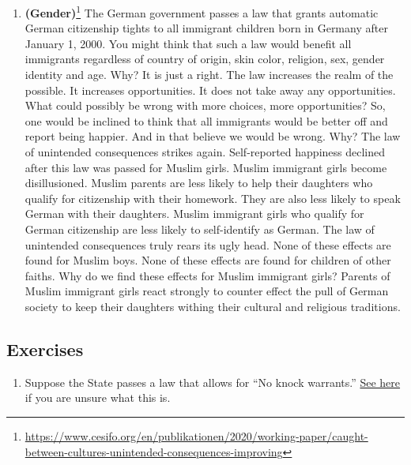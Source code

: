 \documentclass[
]{book}
\providecommand{\tightlist}{%
  \setlength{\itemsep}{0pt}\setlength{\parskip}{0pt}}
\begin{document}
\begin{enumerate}
\def\labelenumi{\arabic{enumi}.}
\setcounter{enumi}{6}
\tightlist
\item
  \textbf{(Gender)}\footnote{\url{https://www.cesifo.org/en/publikationen/2020/working-paper/caught-between-cultures-unintended-consequences-improving}} The German government passes a law that grants automatic German citizenship tights to all immigrant children born in Germany after January 1, 2000. You might think that such a law would benefit all immigrants regardless of country of origin, skin color, religion, sex, gender identity and age. Why? It is just a right. The law increases the realm of the possible. It increases opportunities. It does not take away any opportunities. What could possibly be wrong with more choices, more opportunities? So, one would be inclined to think that all immigrants would be better off and report being happier. And in that believe we would be wrong. Why? The law of unintended consequences strikes again.
  Self-reported happiness declined after this law was passed for Muslim girls. Muslim immigrant girls become disillusioned. Muslim parents are less likely to help their daughters who qualify for citizenship with their homework. They are also less likely to speak German with their daughters. Muslim immigrant girls who qualify for German citizenship are less likely to self-identify as German.
  The law of unintended consequences truly rears its ugly head.
  None of these effects are found for Muslim boys. None of these effects are found for children of other faiths.
  Why do we find these effects for Muslim immigrant girls? Parents of Muslim immigrant girls react strongly to counter effect the pull of German society to keep their daughters withing their cultural and religious traditions.
\end{enumerate}

\hypertarget{exercises}{%
\subsection{Exercises}\label{exercises}}

\begin{enumerate}
\def\labelenumi{\arabic{enumi}.}
\tightlist
\item
  Suppose the State passes a law that allows for ``No knock warrants.'' \href{https://en.wikipedia.org/wiki/No-knock_warrant\#:~:text=In\%20the\%20United\%20States\%2C\%20a,knocking\%20or\%20ringing\%20a\%20doorbell}{See here} if you are unsure what this is.
\end{enumerate}
\end{document}
